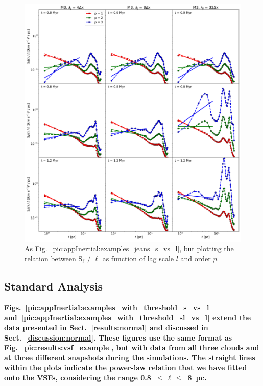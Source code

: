  	
\begin{figure}
    \centering
    \includegraphics[width=\textwidth]{app_examples_jeans_sl_l.pdf}
    \caption{
        As Fig.~\ref{pic:appInertial:examples_jeans_s_vs_l}, but plotting the relation between S$_{\ell}$ / $\ell$ as function of lag scale $l$ and order $p$.
    }
    \label{pic:appInertial:examples_jeans_sl_vs_l}
\end{figure}

\subsection{Standard Analysis}\label{Bsub:standard}

\textbf{
Figs.~\ref{pic:appInertial:examples_with_threshold_s_vs_l} and~\ref{pic:appInertial:examples_with_threshold_sl_vs_l} extend the data presented in Sect.~\ref{results:normal} and discussed in Sect.~\ref{discussion:normal}.
These figures use the same format as Fig.~\ref{pic:results:vsf_example}, but with data from all three clouds and at three different snapshots during the simulations.
The straight lines within the plots indicate the power-law relation that we have fitted onto the VSFs, considering the range 0.8~$\leq\,\ell\,\leq$~8~pc.
}

